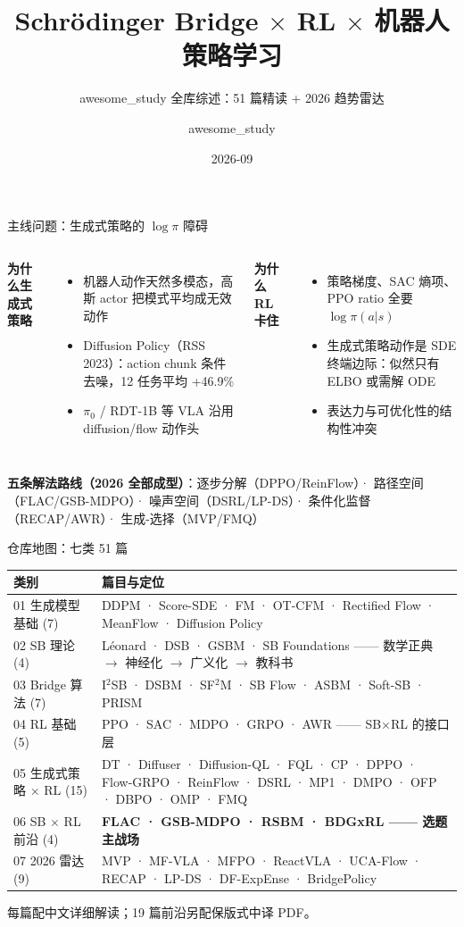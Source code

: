 \documentclass[10pt,aspectratio=169,fontset=none]{ctexbeamer}
\title{Schrödinger Bridge $\times$ RL $\times$ 机器人策略学习}
\subtitle{awesome\_study 全库综述：51 篇精读 + 2026 趋势雷达}
\author{awesome\_study}
\date{2026-09}
\begin{document}
\maketitle

\begin{frame}{主线问题：生成式策略的 $\log\pi$ 障碍}
\begin{columns}[T]
\textbf{为什么生成式策略}
\begin{itemize}
  \item 机器人动作天然多模态，高斯 actor 把模式平均成无效动作
  \item Diffusion Policy（RSS 2023）：action chunk 条件去噪，12 任务平均 +46.9\%
  \item $\pi_0$ / RDT-1B 等 VLA 沿用 diffusion/flow 动作头
\end{itemize}
\textbf{为什么 RL 卡住}
\begin{itemize}
  \item 策略梯度、SAC 熵项、PPO ratio 全要 $\log\pi(a|s)$
  \item 生成式策略动作是 SDE 终端边际：似然只有 ELBO 或需解 ODE
  \item 表达力与可优化性的结构性冲突
\end{itemize}
\end{columns}
\vspace{6pt}
\textbf{五条解法路线（2026 全部成型）}：逐步分解（DPPO/ReinFlow）· 路径空间（FLAC/GSB-MDPO）· 噪声空间（DSRL/LP-DS）· 条件化监督（RECAP/AWR）· 生成-选择（MVP/FMQ）
\end{frame}

\begin{frame}{仓库地图：七类 51 篇}
\small
\begin{tabular}{@{}p{}p{}@{}}
\toprule
\textbf{类别} & \textbf{篇目与定位} \\
\midrule
01 生成模型基础 (7) & DDPM · Score-SDE · FM · OT-CFM · Rectified Flow · MeanFlow · Diffusion Policy \\
02 SB 理论 (4) & Léonard · DSB · GSBM · SB Foundations —— 数学正典 $\to$ 神经化 $\to$ 广义化 $\to$ 教科书 \\
03 Bridge 算法 (7) & I$^2$SB · DSBM · SF$^2$M · SB Flow · ASBM · Soft-SB · PRISM \\
04 RL 基础 (5) & PPO · SAC · MDPO · GRPO · AWR —— SB$\times$RL 的接口层 \\
05 生成式策略 $\times$ RL (15) & DT · Diffuser · Diffusion-QL · FQL · CP · DPPO · Flow-GRPO · ReinFlow · DSRL · MP1 · DMPO · OFP · DBPO · OMP · FMQ \\
06 SB $\times$ RL 前沿 (4) & \textbf{FLAC · GSB-MDPO · RSBM · BDGxRL —— 选题主战场} \\
07 2026 雷达 (9) & MVP · MF-VLA · MFPO · ReactVLA · UCA-Flow · RECAP · LP-DS · DF-ExpEnse · BridgePolicy \\
\bottomrule
\end{tabular}
\vspace{4pt}

每篇配中文详细解读；19 篇前沿另配保版式中译 PDF。
\end{frame}
\end{document}
